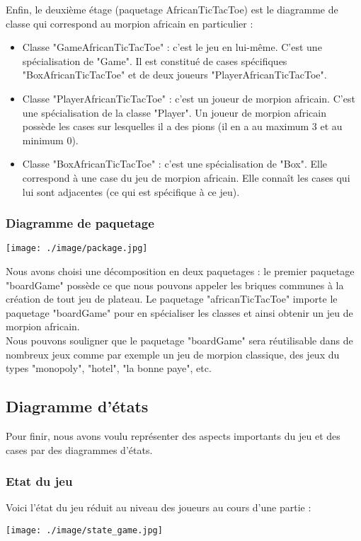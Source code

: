 \documentclass[12pt , a4paper]{article}
\begin{document}
\noindent Enfin, le deuxième étage (paquetage AfricanTicTacToe) est le diagramme de classe qui correspond au morpion africain en particulier :
\begin{itemize}
	\item Classe "GameAfricanTicTacToe" : c'est le jeu en lui-même. C'est une spécialisation de "Game". Il est constitué de cases spécifiques "BoxAfricanTicTacToe" et de deux joueurs "PlayerAfricanTicTacToe".
	\item Classe "PlayerAfricanTicTacToe" : c'est un joueur de morpion africain. C'est une spécialisation de la classe "Player". Un joueur de morpion africain possède les cases sur lesquelles il a des pions (il en a au maximum 3 et au minimum 0).
	\item Classe "BoxAfricanTicTacToe" : c'est une spécialisation de "Box". Elle correspond à une case du jeu de morpion africain. Elle conna\^it les cases qui lui sont adjacentes (ce qui est spécifique à ce jeu).	
\end{itemize}

\subsubsection{Diagramme de paquetage}
	\begin{center}
	  \texttt{[image: ./image/package.jpg]}
	\end{center}
\noindent Nous avons choisi une décomposition en deux paquetages : le premier paquetage "boardGame" possède ce que nous pouvons appeler les briques communes à la création de tout jeu de plateau. Le paquetage "africanTicTacToe" importe le paquetage "boardGame" pour en spécialiser les classes et ainsi obtenir un jeu de morpion africain.\\
Nous pouvons souligner que le paquetage "boardGame" sera réutilisable dans de nombreux jeux comme par exemple un jeu de morpion classique, des jeux du types "monopoly", "hotel", "la bonne paye", etc.
\subsection{Diagramme d'états}
\noindent Pour finir, nous avons voulu représenter des aspects importants du jeu et des cases par des diagrammes d'états.
	\subsubsection{Etat du jeu}
	\noindent Voici l'état du jeu réduit au niveau des joueurs au cours d'une partie :
	\begin{center}
	  \texttt{[image: ./image/state\_game.jpg]}
	\end{center}
\end{document}
